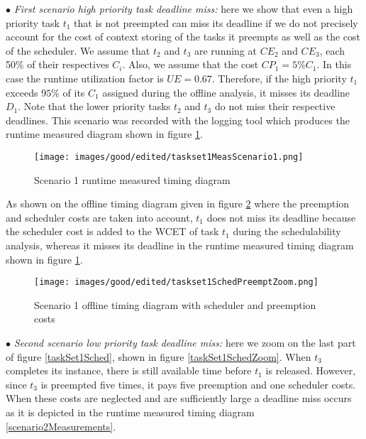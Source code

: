 \documentclass[conference,compsocconf]{IEEEtran}
\begin{document}
$\bullet$ {\em First scenario high priority task deadline miss:} here we show that even a high priority task $t_1$ that is not preempted can miss its deadline if we do not precisely account for the cost of context storing of the tasks it preempts as well as the cost of the scheduler. We assume that $t_2$  and $t_3$ are running at $CE_2$ and $CE_3$, each  50\%  of their respectives $C_i$. Also, we assume that the cost $CP_1 = 5\%C_1$. In this case the runtime utilization factor is $UE=0.67$. Therefore, if the high priority $t_1$ exceeds $95\%$ of its $C_1$ assigned during the offline analysis, it misses its deadline $D_1$. Note that the lower priority tasks $t_2$ and $t_3$ do not miss their respective deadlines. This scenario was recorded with the logging tool which produces the runtime measured diagram shown in figure \ref{scenario1Measurements}. 

\begin{center}
\begin{figure}[h]
  \texttt{[image: images/good/edited/taskset1MeasScenario1.png]}
  \caption{ Scenario 1 runtime measured timing diagram}
  \label{scenario1Measurements}
\end{figure}
\end{center}

As shown on the offline timing diagram given in figure \ref{scenario1costs} where the preemption and scheduler costs are taken into account, $t_1$ does not miss its deadline because the scheduler cost is added to the WCET of task $t_1$ during the schedulability analysis, whereas it misses its deadline in the runtime measured timing diagram shown in figure \ref{scenario1Measurements}. 

\begin{center}
\begin{figure}[h]
  \texttt{[image: images/good/edited/taskset1SchedPreemptZoom.png]}
  \caption{ Scenario 1 offline timing diagram with scheduler and preemption costs}
  \label{scenario1costs}
\end{figure}
\end{center}

$\bullet$ {\em Second scenario low priority task deadline miss:} here we zoom on the last part of figure \ref{taskSet1Sched}, shown in figure \ref{taskSet1SchedZoom}. When $t_3$ completes its instance, there is still available time before $t_1$ is released. However, since $t_3$ is preempted five times, it pays five preemption and one scheduler costs. When these costs are neglected and are sufficiently large a deadline miss occurs as it is depicted in the runtime measured timing diagram \ref{scenario2Measurements}. 
\end{document}
